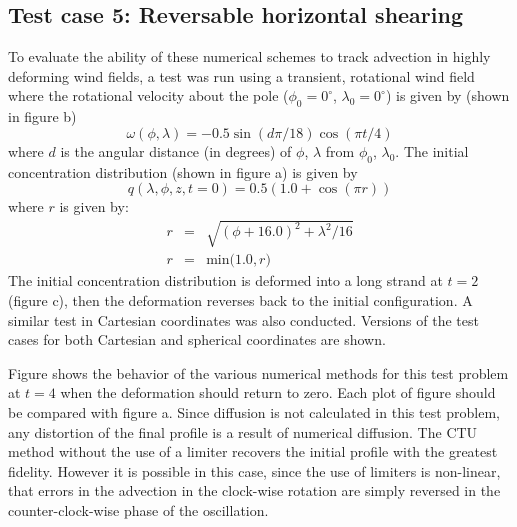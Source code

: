 \subsection{Test case 5: Reversable horizontal shearing}
To evaluate the ability of these numerical schemes to track advection in highly
deforming wind fields, a test was run using a transient, rotational wind field
where the rotational velocity about the pole
($\phi_0=0^{\circ}$, $\lambda_0=0^{\circ}$) is given by (shown in figure b)
\begin{equation}\label{EqTC5Wind}
\omega(\phi,\lambda) = -0.5\sin(d\pi/18) \cos(\pi t/4)
\end{equation}
where $d$ is the angular distance (in degrees) of $\phi$, $\lambda$ from $\phi_0$, $\lambda_0$.
The initial concentration distribution (shown in figure a) is given by
\begin{equation}\label{EqTC5Source1}
q(\lambda,\phi,z,t=0)=0.5 (1.0+\cos(\pi r))
\end{equation}
where $r$ is given by:
\begin{eqnarray}
r &=& \sqrt{(\phi+16.0)^2 + \lambda^2/16} \label{EqTC5Source2} \\
r &=& \mathrm{min(}1.0,r) \label{EqTC5Source3}
\end{eqnarray}
The initial concentration distribution is deformed into a long strand at $t=2$ (figure c),
then the deformation reverses back to the initial configuration.  A similar test in
Cartesian coordinates %
was also conducted.  Versions of the
test cases for both Cartesian and spherical coordinates are shown.

Figure shows the behavior of the various numerical methods for this test problem at $t=4$
when the deformation should return to zero.  Each plot of figure should be compared with
figure a.  Since diffusion is not calculated in this test problem, any distortion of the
final profile is a result of numerical diffusion.  The CTU method without the use of a
limiter recovers the initial profile with the greatest fidelity.  However it is possible
in this case, since the use of limiters is non-linear, that errors in the advection in
the clock-wise rotation are simply reversed in the counter-clock-wise phase of the oscillation.

